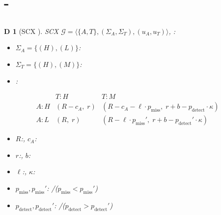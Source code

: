 \documentclass[12pt,a4paper]{article}
\newtheorem{definition}[theorem]Definition
\theoremstyle{remark}
\newcommand{\cG}{\mathcal{G}}
\begin{document}
{\section{-}
\subsection{}
\begin{definition}[SCX ]
SCX $\cG = \langle \{A, T\}, (\Sigma_A, \Sigma_T), (u_A, u_T) \rangle$, : 
\begin{itemize}
 \item $\Sigma_A = \{\text{}(H), \text{}(L)\}$: 
 \item $\Sigma_T = \{\text{}(H), \text{}(M)\}$: 
 \item : 
\end{itemize}
\[
\begin{array}{c|cc}
 & T: H & T: M \\
 \hline
 A: H & (R - c_A, \; r) & (R - c_A - \ell \cdot p_{\text{miss}}, \; r + b - p_{\text{detect}} \cdot \kappa) \\
 A: L & (R, \; r) & (R - \ell \cdot p_{\text{miss}}', \; r + b - p_{\text{detect}}' \cdot \kappa)
\end{array}
\]
\begin{itemize}
 \item $R$:, $c_A$: 
 \item $r$:, $b$: 
 \item $\ell$:, $\kappa$: 
 \item $p_{\text{miss}}, p_{\text{miss}}'$: /($p_{\text{miss}} < p_{\text{miss}}'$)
 \item $p_{\text{detect}}, p_{\text{detect}}'$: /($p_{\text{detect}} > p_{\text{detect}}'$)
\end{itemize}
\end{definition}
}
\end{document}
